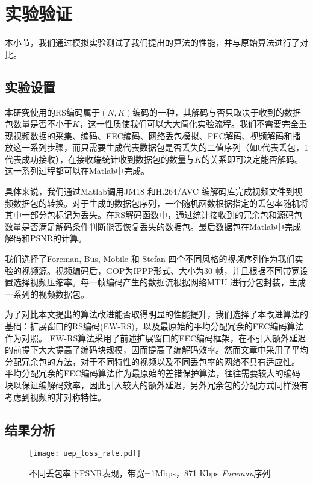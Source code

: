 \section{实验验证}
本小节，我们通过模拟实验测试了我们提出的算法的性能，并与原始算法进行了对比。

    \subsection{实验设置}
    本研究使用的RS编码属于$(N,K)$编码的一种，其解码与否只取决于收到的数据包数量是否不小于$K$，这一性质使我们可以大大简化实验流程。我们不需要完全重现视频数据的采集、编码、FEC编码、网络丢包模拟、FEC解码、视频解码和播放这一系列步骤，而只需要生成代表数据包是否丢失的二值序列（如0代表丢包，1代表成功接收），在接收端统计收到数据包的数量与$K$的关系即可决定能否解码。这一系列过程都可以在Matlab中完成。

    具体来说，我们通过Matlab调用JM18 \cite{website:jm18}和H.264/AVC \cite{zhang2000video} 编解码库完成视频文件到视频数据包的转换。对于生成的数据包序列，一个随机函数根据指定的丢包率随机将其中一部分包标记为丢失。在RS解码函数中，通过统计接收到的冗余包和源码包数量是否满足解码条件判断能否恢复丢失的数据包。最后数据包在Matlab中完成解码和PSNR的计算。

    我们选择了Foreman, Bus, Mobile 和 Stefan 四个不同风格的视频序列作为我们实验的视频源。视频编码后，GOP为IPPP形式、大小为30 帧，并且根据不同带宽设置选择视频压缩率。每一帧编码产生的数据流根据网络MTU 进行分包封装，生成一系列的视频数据包。

    为了对比本文提出的算法改进能否取得明显的性能提升，我们选择了本改进算法的基础：扩展窗口的RS编码(EW-RS)\cite{xiao2013real}，以及最原始的平均分配冗余的FEC编码算法作为对照。
    EW-RS算法采用了前述扩展窗口的FEC编码框架，在不引入额外延迟的前提下大大提高了编码块规模，因而提高了编解码效率。然而文章中采用了平均分配冗余包的方法，对于不同特性的视频以及不同丢包率的网络不具有适应性。
    平均分配冗余的FEC编码算法作为最原始的差错保护算法，往往需要较大的编码块以保证编解码效率，因此引入较大的额外延迟，另外冗余包的分配方式同样没有考虑到视频的非对称特性。

    \subsection{结果分析}

\begin{figure}[htbp]
  \centering
  \texttt{[image: uep\_loss\_rate.pdf]}\\
  \caption{不同丢包率下PSNR表现，带宽=1Mbps，871 Kbps \emph{Foreman}序列}\label{fig:lossrate}
\end{figure}

